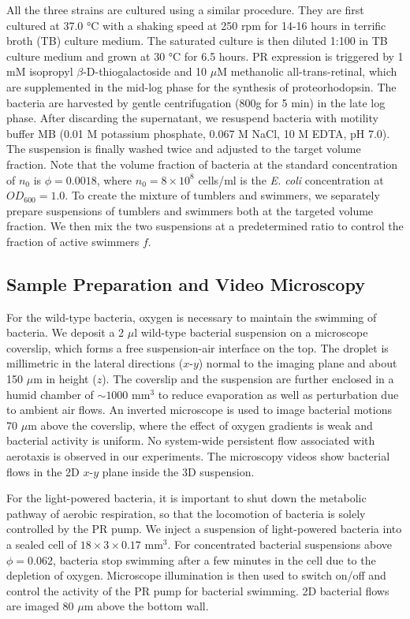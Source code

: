 All the three strains are cultured using a similar procedure. They are first cultured at 37.0 °C with a shaking speed at 250 rpm for 14-16 hours in terrific broth (TB) culture medium. The saturated culture is then diluted 1:100 in TB culture medium and grown at 30 °C for 6.5 hours. PR expression is triggered by 1 mM isopropyl $\beta$-D-thiogalactoside and 10 $\mu$M methanolic all-trans-retinal, which are supplemented in the mid-log phase for the synthesis of proteorhodopsin. The bacteria are harvested by gentle centrifugation (800g for 5 min) in the late log phase. After discarding the supernatant, we resuspend bacteria
with motility buffer MB (0.01 M potassium phosphate, 0.067 M NaCl, 10 M EDTA, pH 7.0). The suspension is finally washed twice and adjusted to the target volume fraction. Note that the volume fraction of bacteria at the standard concentration of $n_0$ is $\phi = 0.0018$, where $n_0 = 8 \times 10^8$ cells/ml is the \textit{E. coli} concentration at $OD_{600} = 1.0$. To create the mixture of tumblers and swimmers, we separately prepare suspensions of tumblers and swimmers both at the targeted volume fraction. We then mix the two suspensions at a predetermined ratio to control the fraction of active swimmers $f$.



\subsection{Sample Preparation and Video Microscopy}
For the wild-type bacteria, oxygen is necessary to maintain the swimming of bacteria. We deposit a 2 $\mu$l wild-type bacterial suspension on a microscope coverslip, which forms a free suspension-air interface on the top. The droplet is millimetric in the lateral directions ($x$-$y$) normal to the imaging plane and about 150 $\mu$m in height ($z$). The coverslip and the suspension are further enclosed in a humid chamber of $\sim 1000$
mm$^3$ to reduce evaporation as well as perturbation due to ambient air flows. An inverted microscope is used to image bacterial motions 70 $\mu$m above the coverslip, where the effect of oxygen gradients is weak and bacterial activity is uniform. No system-wide persistent flow associated with aerotaxis is observed in our experiments. The microscopy videos show bacterial flows in the 2D $x$-$y$ plane inside the 3D suspension.

For the light-powered bacteria, it is important to shut down the metabolic pathway of aerobic respiration, so that the locomotion of bacteria is solely controlled by the PR pump. We inject a suspension of light-powered bacteria into a sealed cell of $18 \times 3 \times 0.17$ mm$^3$. For concentrated bacterial suspensions above $\phi = 0.062$, bacteria stop swimming after a few minutes in the cell due to the depletion of oxygen. Microscope illumination is then used to switch on/off and control the activity of the PR pump for bacterial swimming. 2D bacterial flows are imaged 80 $\mu$m above the bottom wall.

